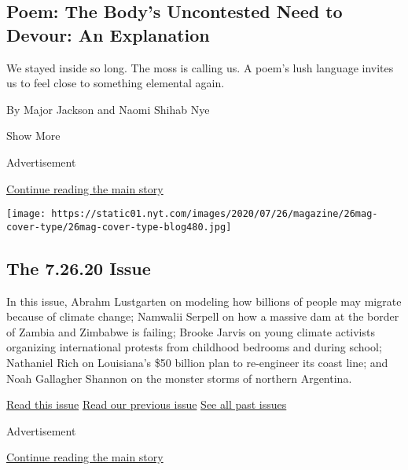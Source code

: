 \begin{enumerate}
  \hypertarget{poem-the-bodys-uncontested-need-to-devour-an-explanation}{%
  \subsection{Poem: The Body's Uncontested Need to Devour: An
  Explanation}\label{poem-the-bodys-uncontested-need-to-devour-an-explanation}}

  We stayed inside so long. The moss is calling us. A poem's lush
  language invites us to feel close to something elemental again.

  By Major Jackson and Naomi Shihab Nye
\end{enumerate}

Show More

Advertisement

\protect\hyperlink{after-mid2}{Continue reading the main story}

\href{https://www.nytimes.com/issue/magazine/2020/07/24/the-72620-issue}{}

\texttt{[image: https://static01.nyt.com/images/2020/07/26/magazine/26mag-cover-type/26mag-cover-type-blog480.jpg]}

\href{https://www.nytimes.com/issue/magazine/2020/07/24/the-72620-issue}{}

\hypertarget{the-72620-issue}{%
\subsection{The 7.26.20 Issue}\label{the-72620-issue}}

In this issue, Abrahm Lustgarten on modeling how billions of people may
migrate because of climate change; Namwalii Serpell on how a massive dam
at the border of Zambia and Zimbabwe is failing; Brooke Jarvis on young
climate activists organizing international protests from childhood
bedrooms and during school; Nathaniel Rich on Louisiana's \$50 billion
plan to re-engineer its coast line; and Noah Gallagher Shannon on the
monster storms of northern Argentina.

\href{https://www.nytimes.com/issue/magazine/2020/07/24/the-72620-issue}{Read
this issue}
\href{https://www.nytimes.com/issue/magazine/2020/07/17/the-71920-issue}{Read
our previous issue}
\href{https://www.nytimes.com/interactive/2020/07/02/magazine/past-issues-sunday-magazine.html}{See
all past issues}

Advertisement

\protect\hyperlink{after-mktg}{Continue reading the main story}

